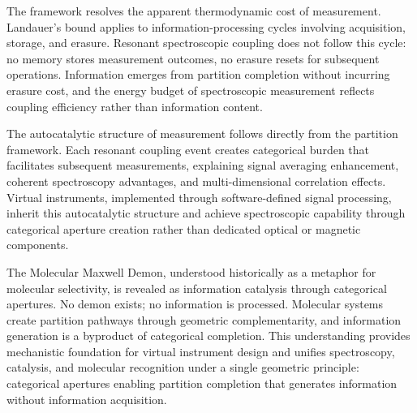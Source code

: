 \documentclass[12pt,a4paper]{article}
\theoremstyle{definition}
\theoremstyle{remark}
\begin{document}
The framework resolves the apparent thermodynamic cost of measurement. Landauer's bound applies to information-processing cycles involving acquisition, storage, and erasure. Resonant spectroscopic coupling does not follow this cycle: no memory stores measurement outcomes, no erasure resets for subsequent operations. Information emerges from partition completion without incurring erasure cost, and the energy budget of spectroscopic measurement reflects coupling efficiency rather than information content.

The autocatalytic structure of measurement follows directly from the partition framework. Each resonant coupling event creates categorical burden that facilitates subsequent measurements, explaining signal averaging enhancement, coherent spectroscopy advantages, and multi-dimensional correlation effects. Virtual instruments, implemented through software-defined signal processing, inherit this autocatalytic structure and achieve spectroscopic capability through categorical aperture creation rather than dedicated optical or magnetic components.

The Molecular Maxwell Demon, understood historically as a metaphor for molecular selectivity, is revealed as information catalysis through categorical apertures. No demon exists; no information is processed. Molecular systems create partition pathways through geometric complementarity, and information generation is a byproduct of categorical completion. This understanding provides mechanistic foundation for virtual instrument design and unifies spectroscopy, catalysis, and molecular recognition under a single geometric principle: categorical apertures enabling partition completion that generates information without information acquisition.




\end{document}
